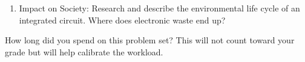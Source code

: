 \documentclass{e85}
\begin{document}
\begin{enumerate}
\begin{enumerate}
    \begin{solution}
    \end{solution}
  \end{enumerate}

\item Impact on Society: Research and describe the environmental life
  cycle of an integrated circuit.  Where does electronic waste end up?

  \begin{solution}
  \end{solution}
\end{enumerate}

How long did you spend on this problem set?  This will not count
toward your grade but will help calibrate the workload.

\begin{solution}
\end{solution}
\end{document}
